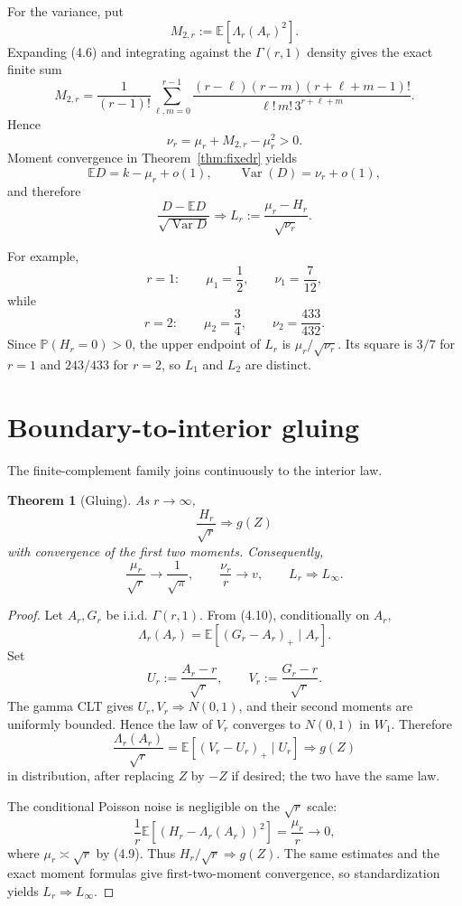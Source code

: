 \documentclass[11pt]{article}
\newtheorem{theorem}{Theorem}[section]
\theoremstyle{remark}
\newcommand{\E}{\mathbb E}
\newcommand{\Pp}{\mathbb P}
\newcommand{\Var}{\operatorname{Var}}
\newcommand{\1}{\mathbf 1}
\begin{document}
For the variance, put
\[
M_{2,r}:=\E[\Lambda_r(A_r)^2].
\]
Expanding (4.6) and integrating against the $\Gamma(r,1)$ density gives the exact finite sum
\[
M_{2,r}
=
\frac1{(r-1)!}
\sum_{\ell,m=0}^{r-1}
\frac{(r-\ell)(r-m)(r+\ell+m-1)!}
{\ell!\,m!\,3^{r+\ell+m}}.
\tag{4.11}
\]
Hence
\[
\nu_r=\mu_r+M_{2,r}-\mu_r^2>0.
\tag{4.12}
\]
Moment convergence in Theorem~\ref{thm:fixedr} yields
\[
\E D=k-\mu_r+o(1),
\qquad
\Var(D)=\nu_r+o(1),
\]
and therefore
\[
\frac{D-\E D}{\sqrt{\Var D}}
\Longrightarrow
L_r:=\frac{\mu_r-H_r}{\sqrt{\nu_r}}.
\tag{4.13}
\]

For example,
\[
r=1:\qquad \mu_1=\frac12,\qquad \nu_1=\frac7{12},
\]
while
\[
r=2:\qquad \mu_2=\frac34,\qquad \nu_2=\frac{433}{432}.
\]
Since $\Pp(H_r=0)>0$, the upper endpoint of $L_r$ is $\mu_r/\sqrt{\nu_r}$. Its square is $3/7$ for $r=1$ and $243/433$ for $r=2$, so $L_1$ and $L_2$ are distinct.

\section{Boundary-to-interior gluing}

The finite-complement family joins continuously to the interior law.

\begin{theorem}[Gluing]\label{thm:glue}
As $r\to\infty$,
\[
\frac{H_r}{\sqrt r}\Longrightarrow g(Z)
\]
with convergence of the first two moments. Consequently,
\[
\frac{\mu_r}{\sqrt r}\to\frac1{\sqrt\pi},
\qquad
\frac{\nu_r}{r}\to v,
\qquad
L_r\Longrightarrow L_\infty.
\]
\end{theorem}

\begin{proof}
Let $A_r,G_r$ be i.i.d. $\Gamma(r,1)$. From (4.10), conditionally on $A_r$,
\[
\Lambda_r(A_r)=\E[(G_r-A_r)_+\mid A_r].
\]
Set
\[
U_r:=\frac{A_r-r}{\sqrt r},
\qquad
V_r:=\frac{G_r-r}{\sqrt r}.
\]
The gamma CLT gives $U_r,V_r\Rightarrow N(0,1)$, and their second moments are uniformly bounded. Hence the law of $V_r$ converges to $N(0,1)$ in $W_1$. Therefore
\[
\frac{\Lambda_r(A_r)}{\sqrt r}
=
\E[(V_r-U_r)_+\mid U_r]
\Longrightarrow g(Z)
\]
in distribution, after replacing $Z$ by $-Z$ if desired; the two have the same law.

The conditional Poisson noise is negligible on the $\sqrt r$ scale:
\[
\frac1r\E[(H_r-\Lambda_r(A_r))^2]
=
\frac{\mu_r}{r}\to0,
\]
where $\mu_r\asymp\sqrt r$ by (4.9). Thus $H_r/\sqrt r\Rightarrow g(Z)$. The same estimates and the exact moment formulas give first-two-moment convergence, so standardization yields $L_r\Rightarrow L_\infty$.
\end{proof}
\end{document}
